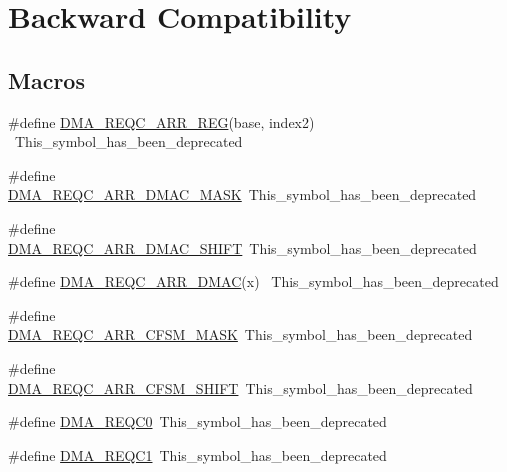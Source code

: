 \hypertarget{group___backward___compatibility___symbols}{}\section{Backward Compatibility}
\label{group___backward___compatibility___symbols}
\subsection*{Macros}
\begin{DoxyCompactItemize}
\item 
\#define \hyperlink{group___backward___compatibility___symbols_gab08b1c5dd92986ed8884c5bb0824cca9}{D\+M\+A\+\_\+\+R\+E\+Q\+C\+\_\+\+A\+R\+R\+\_\+\+R\+EG}(base,  index2)                    ~This\+\_\+symbol\+\_\+has\+\_\+been\+\_\+deprecated
\item 
\#define \hyperlink{group___backward___compatibility___symbols_ga8e9317db9c352716b95281ed740c533e}{D\+M\+A\+\_\+\+R\+E\+Q\+C\+\_\+\+A\+R\+R\+\_\+\+D\+M\+A\+C\+\_\+\+M\+A\+SK}~This\+\_\+symbol\+\_\+has\+\_\+been\+\_\+deprecated
\item 
\#define \hyperlink{group___backward___compatibility___symbols_gabcd06f16caa331a970dac85d4d707107}{D\+M\+A\+\_\+\+R\+E\+Q\+C\+\_\+\+A\+R\+R\+\_\+\+D\+M\+A\+C\+\_\+\+S\+H\+I\+FT}~This\+\_\+symbol\+\_\+has\+\_\+been\+\_\+deprecated
\item 
\#define \hyperlink{group___backward___compatibility___symbols_gab60dcd6bbc229736278d16e8ea267f15}{D\+M\+A\+\_\+\+R\+E\+Q\+C\+\_\+\+A\+R\+R\+\_\+\+D\+M\+AC}(x)                                      ~This\+\_\+symbol\+\_\+has\+\_\+been\+\_\+deprecated
\item 
\#define \hyperlink{group___backward___compatibility___symbols_gaa28ab53f19cb06ff7ab8a03dfc646355}{D\+M\+A\+\_\+\+R\+E\+Q\+C\+\_\+\+A\+R\+R\+\_\+\+C\+F\+S\+M\+\_\+\+M\+A\+SK}~This\+\_\+symbol\+\_\+has\+\_\+been\+\_\+deprecated
\item 
\#define \hyperlink{group___backward___compatibility___symbols_ga7130ea81cb843080f9c2ec4e537cd81c}{D\+M\+A\+\_\+\+R\+E\+Q\+C\+\_\+\+A\+R\+R\+\_\+\+C\+F\+S\+M\+\_\+\+S\+H\+I\+FT}~This\+\_\+symbol\+\_\+has\+\_\+been\+\_\+deprecated
\item 
\#define \hyperlink{group___backward___compatibility___symbols_ga734643acca0a28e7a07dc8c705fbc1f8}{D\+M\+A\+\_\+\+R\+E\+Q\+C0}~This\+\_\+symbol\+\_\+has\+\_\+been\+\_\+deprecated
\item 
\#define \hyperlink{group___backward___compatibility___symbols_gadfccb3dbbd2bc4fc89afd35a2743d074}{D\+M\+A\+\_\+\+R\+E\+Q\+C1}~This\+\_\+symbol\+\_\+has\+\_\+been\+\_\+deprecated

\end{DoxyCompactItemize}
